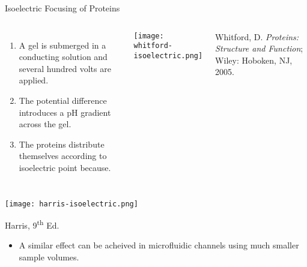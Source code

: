 \documentclass[handout]{beamer}
\begin{document}
\begin{frame}[allowframebreaks]{Isoelectric Focusing of Proteins}
	\begin{columns}
		\begin{enumerate}
			\item A gel is submerged in a conducting solution and
				several hundred volts are applied.
			\item The potential difference introduces a pH gradient
				across the gel.
			\item The proteins distribute themselves according to
				isoelectric point because.
		\end{enumerate}
		\begin{center}
		\texttt{[image: whitford-isoelectric.png]}
	\end{center}

		\bigskip

		{\footnotesize Whitford, D. \textit{Proteins: Structure and
		Function}; Wiley: Hoboken, NJ, 2005.}

	\end{columns}

	\framebreak

	\begin{center}
		\texttt{[image: harris-isoelectric.png]}
	\end{center}
	{\footnotesize Harris, 9\textsuperscript{th} Ed.}

	\bigskip

	\begin{itemize}
		\item A similar effect can be acheived in microfluidic channels
			using \alert{much smaller} sample volumes.
\end{itemize}
\end{frame}
\end{document}
